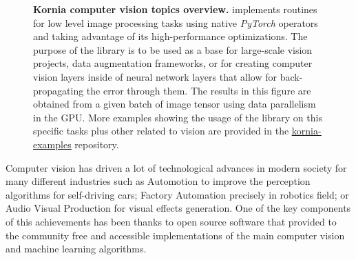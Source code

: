 \begin{figure}[h!]
\begin{center}
\begin{tabular}{c c c c c}
        \end{tabular}
    \end{center}
    \caption[Kornia computer vision topics overview]{\textbf{Kornia computer vision topics overview.} \lib{} implements routines for low level image processing tasks using native \textit{PyTorch} operators and taking advantage of its high-performance optimizations. The purpose of the library is to be used as a base for large-scale vision projects, data augmentation frameworks, or for creating computer vision layers inside of neural network layers that allow for back-propagating the error through them. The results in this figure are obtained from a given batch of image tensor using data parallelism in the GPU. More examples showing the usage of the library on this specific tasks plus other related to vision are provided in the \underline{\color{blue}\href{https://github.com/kornia/kornia-examples}{kornia-examples}} repository.}
    \label{fig:imgproc}
\end{figure}

Computer vision has driven a lot of technological advances in modern society for many different industries such as Automotion to improve the perception algorithms for self-driving cars; Factory Automation precisely in robotics field; or Audio Visual Production for visual effects generation. One of the key components of this achievements has been thanks to open source software that provided to the community free and accessible implementations of the main computer vision and machine learning algorithms.


